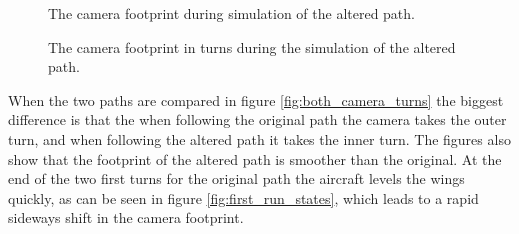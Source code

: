 \begin{figure}[]
    \centering
    \caption{The camera footprint during simulation of the altered path.}
	\label{fig:second_camera_path}
\end{figure}

\begin{figure}[]
    \centering
    \caption{The camera footprint in turns during the simulation of the altered path.}
	\label{fig:second_camera_turns}
\end{figure}

When the two paths are compared in figure \ref{fig:both_camera_turns} the biggest difference is that the when following the original path the camera takes the outer turn, and when following the altered path it takes the inner turn. The figures also show that the footprint of the altered path is smoother than the original. At the end of the two first turns for the original path the aircraft levels the wings quickly, as can be seen in figure \ref{fig:first_run_states}, which leads to a rapid sideways shift in the camera footprint.

